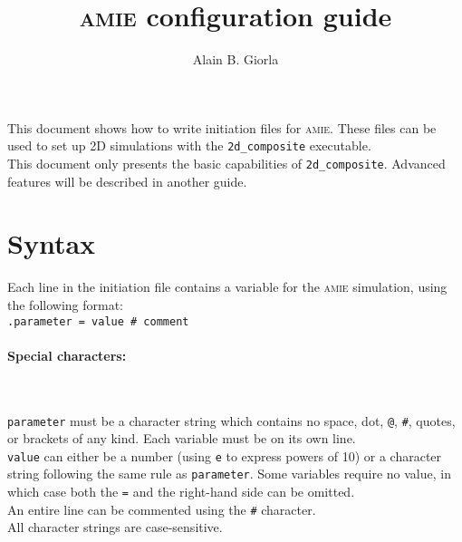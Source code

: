 \documentclass[10pt]{article}
\newcommand{\amie}{\textsc{amie}\xspace}
\newcommand{\whiteline}{\textcolor{white}{.\\}}
\begin{document}
\title{\amie configuration guide}
\author{Alain B. Giorla}

\maketitle

This document shows how to write initiation files for \amie. 
These files can be used to set up 2D simulations with the \verb+2d_composite+ executable.\\

This document only presents the basic capabilities of \verb+2d_composite+.
Advanced features will be described in another guide.


\tableofcontents

\eject

\listoftables
{}

\eject 

\section{Syntax}

Each line in the initiation file contains a variable for the \amie simulation, using the following format:\\

\noindent \verb+.parameter = value # comment+\\

\paragraph{Special characters:} \whiteline

\verb+parameter+ must be a character string which contains no space, dot, \verb+@+, \verb+#+, quotes, or brackets of any kind.
Each variable must be on its own line.\\

\verb+value+ can either be a number (using \verb+e+ to express powers of 10) or a character string following the same rule as \verb+parameter+.
Some variables require no value, in which case both the \verb+=+ and the right-hand side can be omitted.\\

An entire line can be commented using the \verb+#+ character.\\

All character strings are case-sensitive.\\
\end{document}
